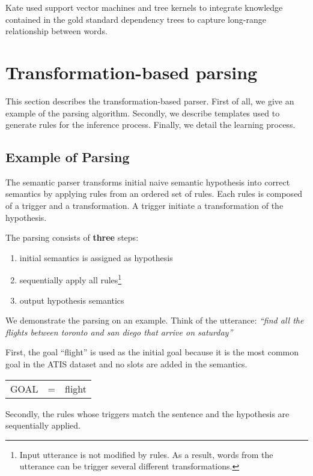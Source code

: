 \documentclass[11pt]{article}
\begin{document}
Kate \cite{kate08} used support vector machines and tree kernels to integrate knowledge contained in the gold standard dependency trees to capture long-range relationship between words. 

\section{Transformation-based parsing} \label{sec:tbl}
This section describes the transformation-based parser. First of all, we give an example of the parsing algorithm. Secondly, we describe  templates used to generate rules for the inference process. Finally, we detail the learning process. 

\subsection{Example of Parsing} \label{sec:tbl:example}
The semantic parser transforms initial naive semantic hypothesis into correct semantics by applying rules from an ordered set of rules. Each rules is composed of a trigger and a transformation. A trigger initiate a transformation of the hypothesis.

The parsing consists of \textbf{three} steps: 
\begin{enumerate}
  \item initial semantics is assigned as hypothesis
  \item sequentially apply all rules\footnote{Input utterance is not modified by rules. As a result, words from the utterance can be trigger several different transformations.}
  \item output hypothesis semantics
\end{enumerate}

We demonstrate the parsing on an example. Think of the utterance: \textit{``find all the flights between toronto and san diego that arrive on saturday''} 

First, the goal ``flight'' is used as the initial goal because it is the most common goal in the ATIS dataset and no slots are added in the semantics.

\vspace{.25cm}
\begin{tabular}{lll}
  GOAL & = & flight
\end{tabular} 
\vspace{.25cm}

Secondly, the rules whose triggers match the sentence and the hypothesis are sequentially applied.
\end{document}
